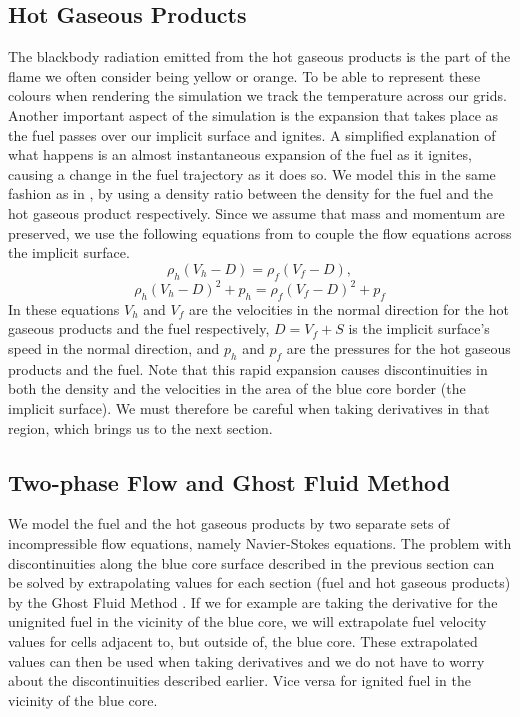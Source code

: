 \subsection{Hot Gaseous Products}
\label{sec:hot_gaseous_products}
The blackbody radiation emitted from the hot gaseous products is the part of the flame we often consider being yellow or orange. To be able to represent these colours when rendering the simulation we track the temperature across our grids. Another important aspect of the simulation is the expansion that takes place as the fuel passes over our implicit surface and ignites. A simplified explanation of what happens is an almost instantaneous expansion of the fuel as it ignites, causing a change in the fuel trajectory as it does so. We model this in the same fashion as in \cite{Nguyen02}, by using a density ratio between the density for the fuel and the hot gaseous product respectively. Since we assume that mass and momentum are preserved, we use the following equations from \cite{Nguyen02} to couple the flow equations across the implicit surface.
\begin{equation}
\rho_h(V_h-D) = \rho_f(V_f-D),
\end{equation}
\begin{equation}
\rho_h(V_h-D)^2+p_h = \rho_f(V_f-D)^2+p_f
\end{equation}
In these equations $V_h$ and $V_f$ are the velocities in the normal direction for the hot gaseous products and the fuel respectively, $D = V_f+S$ is the implicit surface's speed in the normal direction, and $p_h$ and $p_f$ are the pressures for the hot gaseous products and the fuel. Note that this rapid expansion causes discontinuities in both the density and the velocities in the area of the blue core border (the implicit surface). We must therefore be careful when taking derivatives in that region, which brings us to the next section.
\subsection{Two-phase Flow and Ghost Fluid Method}
We model the fuel and the hot gaseous products by two separate sets of incompressible flow equations, namely Navier-Stokes equations. The problem with discontinuities along the blue core surface described in the previous section can be solved by extrapolating values for each section (fuel and hot gaseous products) by the Ghost Fluid Method \cite{Ghost}. If we  for example are taking the derivative for the unignited fuel in the vicinity of the blue core, we will extrapolate fuel velocity values for cells adjacent to, but outside of, the blue core. These extrapolated values can then be used when taking derivatives and we do not have to worry about the discontinuities described earlier. Vice versa for ignited fuel in the vicinity of the blue core.